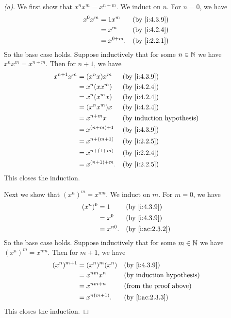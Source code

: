 \begin{proof}[(a)]
  We first show that \(x^n x^m = x^{n + m}\).
  We induct on \(n\).
  For \(n = 0\), we have
  \begin{align*}
    x^0 x^m & = 1 x^m      &  & \by{i:4.3.9} \\
            & = x^m        &  & \by{i:4.2.4} \\
            & = x^{0 + m}. &  & \by{i:2.2.1}
  \end{align*}
  So the base case holds.
  Suppose inductively that for some \(n \in \mathbb{N}\) we have \(x^n x^m = x^{n + m}\).
  Then for \(n + 1\), we have
  \begin{align*}
    x^{n + 1} x^m & = (x^n x) x^m      &  & \by{i:4.3.9} \\
                  & = x^n (x x^m)      &  & \by{i:4.2.4} \\
                  & = x^n (x^m x)      &  & \by{i:4.2.4} \\
                  & = (x^n x^m) x      &  & \by{i:4.2.4} \\
                  & = x^{n + m} x      &  & \byIH        \\
                  & = x^{(n + m) + 1}  &  & \by{i:4.3.9} \\
                  & = x^{n + (m + 1)}  &  & \by{i:2.2.5} \\
                  & = x^{n + (1 + m)}  &  & \by{i:2.2.4} \\
                  & = x^{(n + 1) + m}. &  & \by{i:2.2.5}
  \end{align*}
  This closes the induction.

  Next we show that \((x^n)^m = x^{nm}\).
  We induct on \(m\).
  For \(m = 0\), we have
  \begin{align*}
    (x^n)^0 & = 1       &  & \by{i:4.3.9}    \\
            & = x^0     &  & \by{i:4.3.9}    \\
            & = x^{n0}. &  & \by{i:ac:2.3.2}
  \end{align*}
  So the base case holds.
  Suppose inductively that for some \(m \in \mathbb{N}\) we have \((x^n)^m = x^{nm}\).
  Then for \(m + 1\), we have
  \begin{align*}
    (x^n)^{m + 1} & = (x^n)^m (x^n) &  & \by{i:4.3.9}                  \\
                  & = x^{nm} x^n    &  & \byIH                         \\
                  & = x^{nm + n}    &  & \text{(from the proof above)} \\
                  & = x^{n(m + 1)}. &  & \by{i:ac:2.3.3}
  \end{align*}
  This closes the induction.


\end{proof}
